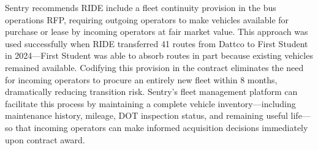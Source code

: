 \begin{description}[style=nextline, leftmargin=0.5cm]
    \item[\faIcon{recycle} \textbf{Fleet Transition Strategy:}] Sentry recommends RIDE include a fleet continuity provision in the bus operations RFP, requiring outgoing operators to make vehicles available for purchase or lease by incoming operators at fair market value. This approach was used successfully when RIDE transferred 41 routes from Dattco to First Student in 2024---First Student was able to absorb routes in part because existing vehicles remained available. Codifying this provision in the contract eliminates the need for incoming operators to procure an entirely new fleet within 8 months, dramatically reducing transition risk. Sentry's fleet management platform can facilitate this process by maintaining a complete vehicle inventory---including maintenance history, mileage, DOT inspection status, and remaining useful life---so that incoming operators can make informed acquisition decisions immediately upon contract award.
\end{description}
